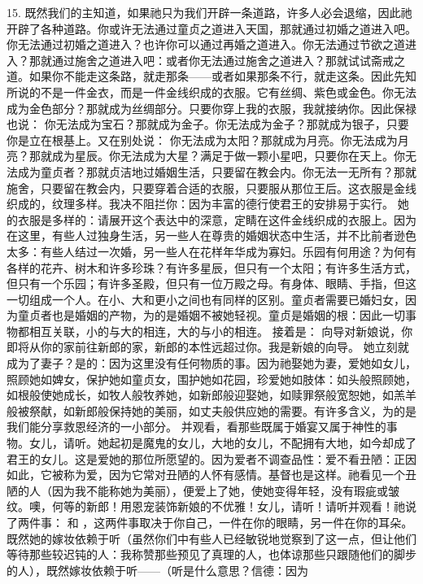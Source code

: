 15. 既然我们的主知道，如果祂只为我们开辟一条道路，许多人必会退缩，因此祂开辟了各种道路。你或许无法通过童贞之道进入天国，那就通过初婚之道进入吧。你无法通过初婚之道进入？也许你可以通过再婚之道进入。你无法通过节欲之道进入？那就通过施舍之道进入吧：或者你无法通过施舍之道进入？那就试试斋戒之道。如果你不能走这条路，就走那条——或者如果那条不行，就走这条。因此先知所说的不是一件金衣，而是一件金线织成的衣服。它有丝绸、紫色或金色。你无法成为金色部分？那就成为丝绸部分。只要你穿上我的衣服，我就接纳你。因此保禄也说：  你无法成为宝石？那就成为金子。你无法成为金子？那就成为银子，只要你是立在根基上。又在别处说：  你无法成为太阳？那就成为月亮。你无法成为月亮？那就成为星辰。你无法成为大星？满足于做一颗小星吧，只要你在天上。你无法成为童贞者？那就贞洁地过婚姻生活，只要留在教会内。你无法一无所有？那就施舍，只要留在教会内，只要穿着合适的衣服，只要服从那位王后。这衣服是金线织成的，纹理多样。我决不阻拦你：因为丰富的德行使君王的安排易于实行。 她的衣服是多样的：请展开这个表达中的深意，定睛在这件金线织成的衣服上。因为在这里，有些人过独身生活，另一些人在尊贵的婚姻状态中生活，并不比前者逊色太多：有些人结过一次婚，另一些人在花样年华成为寡妇。乐园有何用途？为何有各样的花卉、树木和许多珍珠？有许多星辰，但只有一个太阳；有许多生活方式，但只有一个乐园；有许多圣殿，但只有一位万殿之母。有身体、眼睛、手指，但这一切组成一个人。在小、大和更小之间也有同样的区别。童贞者需要已婚妇女，因为童贞者也是婚姻的产物，为的是婚姻不被她轻视。童贞是婚姻的根：因此一切事物都相互关联，小的与大的相连，大的与小的相连。 接着是： 向导对新娘说，你即将从你的家前往新郎的家，新郎的本性远超过你。我是新娘的向导。 她立刻就成为了妻子？是的：因为这里没有任何物质的事。因为祂娶她为妻，爱她如女儿，照顾她如婢女，保护她如童贞女，围护她如花园，珍爱她如肢体：如头般照顾她，如根般使她成长，如牧人般牧养她，如新郎般迎娶她，如赎罪祭般宽恕她，如羔羊般被祭献，如新郎般保持她的美丽，如丈夫般供应她的需要。有许多含义，为的是我们能分享救恩经济的一小部分。 并观看，看那些既属于婚宴又属于神性的事物。女儿，请听。她起初是魔鬼的女儿，大地的女儿，不配拥有大地，如今却成了君王的女儿。这是爱她的那位所愿望的。因为爱者不调查品性：爱不看丑陋：正因如此，它被称为爱，因为它常对丑陋的人怀有感情。基督也是这样。祂看见一个丑陋的人（因为我不能称她为美丽），便爱上了她，使她变得年轻，没有瑕疵或皱纹。噢，何等的新郎！用恩宠装饰新娘的不优雅！女儿，请听！请听并观看！祂说了两件事： 和 ，这两件事取决于你自己，一件在你的眼睛，另一件在你的耳朵。既然她的嫁妆依赖于听（虽然你们中有些人已经敏锐地觉察到了这一点，但让他们等待那些较迟钝的人：我称赞那些预见了真理的人，也体谅那些只跟随他们的脚步的人），既然嫁妆依赖于听——（听是什么意思？信德：因为 